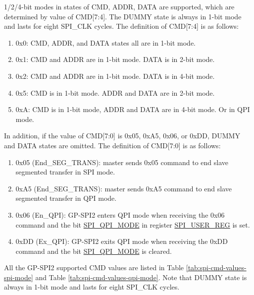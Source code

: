 \documentclass[main\_\_EN.tex]{subfiles}
\begin{document}
1/2/4-bit modes in states of CMD, ADDR, DATA are supported, which are determined by value of CMD[7:4]. The DUMMY state is always in 1-bit mode and lasts for eight SPI\_CLK cycles. The definition of CMD[7:4] is as follows:

\begin{enumerate}
    \item 0x0: CMD, ADDR, and DATA states all are in 1-bit mode.
    \item 0x1: CMD and ADDR are in 1-bit mode. DATA is in 2-bit mode.
    \item 0x2: CMD and ADDR are in 1-bit mode. DATA is in 4-bit mode.
    \item 0x5: CMD is in 1-bit mode. ADDR and DATA are in 2-bit mode.
    \item 0xA: CMD is in 1-bit mode, ADDR and DATA are in 4-bit mode. Or in QPI mode.
\end{enumerate}

In addition, if the value of CMD[7:0] is 0x05, 0xA5, 0x06, or 0xDD, DUMMY and DATA states are omitted. The definition of CMD[7:0] is as follows:

\begin{enumerate}
    \item \label{other:spi-item-end-seg-trans}0x05 (End\_SEG\_TRANS): master sends 0x05 command to end slave segmented transfer in SPI mode.
    \item 0xA5 (End\_SEG\_TRANS): master sends 0xA5 command to end slave segmented transfer in QPI mode.
    \item 0x06 (En\_QPI): GP-SPI2 enters QPI mode when receiving the 0x06 command and the bit \hyperref[fielddesc:SPIQPIMODE]{SPI\_QPI\_MODE} in register \hyperref[regdesc:SPIUSERREG]{SPI\_USER\_REG} is set.
    \item 0xDD (Ex\_QPI): GP-SPI2 exits QPI mode when receiving the 0xDD command and the bit \hyperref[fielddesc:SPIQPIMODE]{SPI\_QPI\_MODE} is cleared.
\end{enumerate}


All the GP-SPI2 supported CMD values are listed in Table \ref{tab:spi-cmd-values-spi-mode} and Table \ref{tab:spi-cmd-values-qpi-mode}. Note that DUMMY state is always in 1-bit mode and lasts for eight SPI\_CLK cycles.
\end{document}
